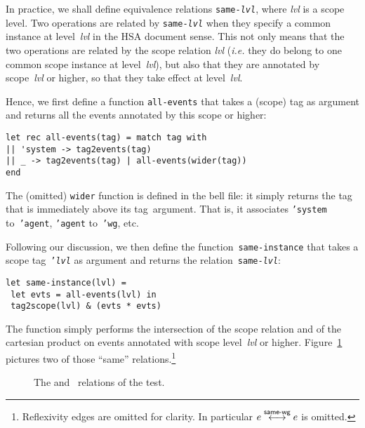\documentclass[a4paper]{article}
\begin{document}
In practice, we shall define equivalence relations
\texttt{same-\textit{lvl}}, where \textit{lvl} is a scope level.
Two operations are related by \texttt{same-\textit{lvl}}
when they specify a common instance at level~\textit{lvl} in the HSA document
sense.
This not only means that the two operations
are related by the scope relation \textit{lvl} (\emph{i.e.}
they do belong to one common scope instance at level~\textit{lvl}),
but also that they are annotated by scope~\textit{lvl} or higher,
so that they take effect at level~\textit{lvl}.

Hence, we first define a function \texttt{all-events} that takes
a (scope) tag as argument and returns all the events annotated by
this scope or higher:
\begin{verbatim}
let rec all-events(tag) = match tag with
|| 'system -> tag2events(tag)
|| _ -> tag2events(tag) | all-events(wider(tag))
end
\end{verbatim}
The (omitted) \texttt{wider} function is defined in the bell file:
it simply returns
the tag that is immediately above its tag~argument.
That is, it associates \texttt{'system} to~\texttt{'agent}, \texttt{'agent}
to~\texttt{'wg}, etc.

Following our discussion, we then
define the function~\texttt{same-instance} that takes a scope
tag~\texttt{'\textit{lvl}} as argument and returns the
relation~\texttt{same-\textit{lvl}}:
\begin{verbatim}
let same-instance(lvl) =
 let evts = all-events(lvl) in
 tag2scope(lvl) & (evts * evts)
\end{verbatim}
The function simply performs the intersection of the scope relation
and of the cartesian product on events annotated with
scope level~\textit{lvl} or higher. Figure~\ref{isa2same} pictures two of
those ``same'' relations.\footnote{Reflexivity edges are omitted for clarity.
In particular $e \overset{\textsf{\scriptsize{}same-wg}}{\longleftrightarrow} e$ is omitted.}
\begin{figure}
\caption{\label{isa2same}The  and~ relations of the  test.}
\begin{center}\hspace*{-2cm}\end{center}
\end{figure}
\end{document}
